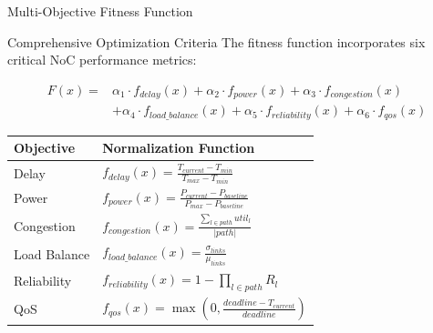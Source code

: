 \documentclass[10pt]{beamer}
\begin{document}
\begin{frame}{Multi-Objective Fitness Function}
    \begin{block}{Comprehensive Optimization Criteria}
        The fitness function incorporates six critical NoC performance metrics:
    \end{block}
    
    \begin{equation}
        \begin{split}
            F(x) = & \alpha_1 \cdot f_{delay}(x) + \alpha_2 \cdot f_{power}(x) + \alpha_3 \cdot f_{congestion}(x) \\
                 & + \alpha_4 \cdot f_{load\_balance}(x) + \alpha_5 \cdot f_{reliability}(x) + \alpha_6 \cdot f_{qos}(x)
        \end{split}
    \end{equation}
    
    \begin{table}
        \centering
        \small
        \begin{tabular}{@{}ll@{}}
            \toprule
            \textbf{Objective} & \textbf{Normalization Function} \\
            \midrule
            Delay & $f_{delay}(x) = \frac{T_{current} - T_{min}}{T_{max} - T_{min}}$ \\
            Power & $f_{power}(x) = \frac{P_{current} - P_{baseline}}{P_{max} - P_{baseline}}$ \\
            Congestion & $f_{congestion}(x) = \frac{\sum_{l \in path} util_l}{|path|}$ \\
            Load Balance & $f_{load\_balance}(x) = \frac{\sigma_{links}}{\mu_{links}}$ \\
            Reliability & $f_{reliability}(x) = 1 - \prod_{l \in path} R_l$ \\
            QoS & $f_{qos}(x) = \max(0, \frac{deadline - T_{current}}{deadline})$ \\
            \bottomrule
        \end{tabular}
    \end{table}
\end{frame}
\end{document}
